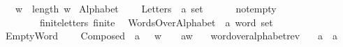\begin{isabellebody}
\ \ {\isachardoublequoteopen}{\isacharbar}{\kern0pt}w{\isacharbar}{\kern0pt}\ {\isasymequiv}\ length\ w{\isachardoublequoteclose}%
\isadelimdocument
%
\endisadelimdocument
%
\isatagdocument
%
\isamarkuptrue%
%
\endisatagdocument
{\isafolddocument}%
%
\isadelimdocument
%
\endisadelimdocument
{}\isamarkupfalse%
\ Alphabet\ {\isacharequal}{\kern0pt}\isanewline
\ \ \ Letters\ {\isacharcolon}{\kern0pt}{\isacharcolon}{\kern0pt}\ {\isachardoublequoteopen}{\isacharprime}{\kern0pt}a\ set\ {\isachardoublequoteclose}\ \ {\isacharparenleft}{\kern0pt}{\isachardoublequoteopen}{\isasymSigma}{\isachardoublequoteclose}{\isacharparenright}{\kern0pt}\isanewline
\ \ \ not{\isacharunderscore}{\kern0pt}empty{\isacharcolon}{\kern0pt}\ \ \ \ \ \ {\isachardoublequoteopen}{\isasymSigma}\ {\isasymnoteq}\ {\isacharbraceleft}{\kern0pt}{\isacharbraceright}{\kern0pt}{\isachardoublequoteclose}\isanewline
\ \ \ \ \ \ \ finite{\isacharunderscore}{\kern0pt}letters{\isacharcolon}{\kern0pt}\ {\isachardoublequoteopen}finite\ {\isasymSigma}{\isachardoublequoteclose}\isanewline
{}\isanewline
\isanewline
{}\isamarkupfalse%
\ WordsOverAlphabet\ {\isacharcolon}{\kern0pt}{\isacharcolon}{\kern0pt}\ {\isachardoublequoteopen}{\isacharprime}{\kern0pt}a\ word\ set{\isachardoublequoteclose}\ \ {\isacharparenleft}{\kern0pt}{\isachardoublequoteopen}{\isasymSigma}\isactrlsup {\isacharasterisk}{\kern0pt}{\isachardoublequoteclose}\ {}{}{}{\isacharparenright}{\kern0pt}\ \isanewline
EmptyWord{\isacharcolon}{\kern0pt}\ {\isachardoublequoteopen}{\isasymepsilon}\ {\isasymin}\ {\isasymSigma}\isactrlsup {\isacharasterisk}{\kern0pt}{\isachardoublequoteclose}\ {\isacharbar}{\kern0pt}\isanewline
Composed{\isacharcolon}{\kern0pt}\ \ {\isachardoublequoteopen}{\isasymlbrakk}a\ {\isasymin}\ {\isasymSigma}{\isacharsemicolon}{\kern0pt}\ w\ {\isasymin}\ {\isasymSigma}\isactrlsup {\isacharasterisk}{\kern0pt}{\isasymrbrakk}\ {\isasymLongrightarrow}\ {\isacharparenleft}{\kern0pt}a{\isacharhash}{\kern0pt}w{\isacharparenright}{\kern0pt}\ {\isasymin}\ {\isasymSigma}\isactrlsup {\isacharasterisk}{\kern0pt}{\isachardoublequoteclose}\isanewline
\isanewline
{}\isamarkupfalse%
\ word{\isacharunderscore}{\kern0pt}over{\isacharunderscore}{\kern0pt}alphabet{\isacharunderscore}{\kern0pt}rev{\isacharcolon}{\kern0pt}\isanewline
\ \ \ a\ {\isacharcolon}{\kern0pt}{\isacharcolon}{\kern0pt}\ {\isachardoublequoteopen}{\isacharprime}{\kern0pt}a{\isachardoublequoteclose}\isanewline

\end{isabellebody}
